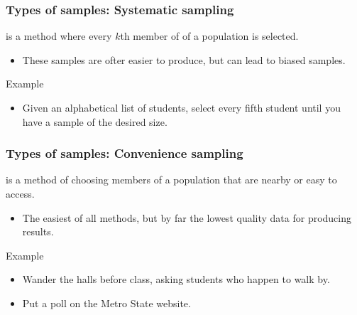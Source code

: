 \documentclass[xcolor=table]{beamer}
\begin{document}
\begin{frame}
\frametitle{Types of samples: Systematic sampling}

\begin{block}{}
\large {} is a method where every $k$th member of of a population is selected.
\begin{itemize}
\item These samples are ofter easier to produce, but can lead to biased samples. 
\end{itemize}
\end{block}
\pause
\begin{exampleblock}{Example}
\begin{itemize}
\item Given an alphabetical list of students, select every fifth student until you have a sample of the desired size.
\end{itemize}
\end{exampleblock}

\end{frame}

\begin{frame}
\frametitle{Types of samples: Convenience sampling}

\begin{block}{}
\large {} is a method of choosing members of a population that are nearby or easy to access.
\begin{itemize}
\item The easiest of all methods, but by far the lowest quality data for producing results.
\end{itemize}
\end{block}
\pause
\begin{exampleblock}{Example}
\begin{itemize}
\item Wander the halls before class, asking students who happen to walk by.
\item Put a poll on the Metro State website.
\end{itemize}

\end{exampleblock}
\end{frame}
\end{document}
